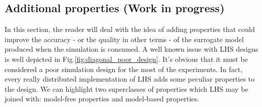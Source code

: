 \documentclass[12pt]{article}
\newcommand{\mfigref}[1]{Fig.\ref{#1}}
\begin{document}
\subsection{Additional properties (Work in progress)}
\label{subsec:lhs_properties}
In this section, the reader will deal with the idea of adding properties that could improve the accuracy - or the quality in other terms - of the surrogate model produced when the simulation is consumed.
A well known issue with LHS designs is well depicted in \mfigref{fig:diagonal_poor_design}. It's obvious that it must be considered a poor simulation design for the most of the experiments. In fact, every really distributed implementation of LHS adds some peculiar properties to the design. We can highlight two superclasses of properties which LHS may be joined with: model-free properties and model-based properties.
\end{document}
